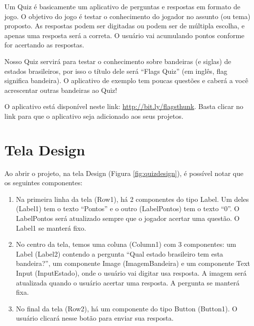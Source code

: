 \documentclass[11pt,fleqn]{book} %
\begin{document}
Um Quiz é basicamente um aplicativo de perguntas e respostas em formato de jogo. O objetivo do jogo é testar o conhecimento do jogador no assunto (ou tema) proposto. As respostas podem ser digitadas ou podem ser de múltipla escolha, e apenas uma resposta será a correta. O usuário vai acumulando pontos conforme for acertando as respostas. 

Nosso Quiz servirá para testar o conhecimento sobre bandeiras (e siglas) de estados brasileiros, por isso o título dele será ``Flags Quiz'' (em inglês, flag significa bandeira). O aplicativo de exemplo tem poucas questões e caberá a você acrescentar outras bandeiras ao Quiz!


O aplicativo está disponível neste link: \url{http://bit.ly/flagsthunk}.
Basta clicar no link para que o aplicativo seja adicionado aos seus projetos.



\section{Tela Design}
Ao abrir o projeto, na tela Design (Figura \ref{fig:quizdesign}), é possível notar que os seguintes componentes:

\begin{enumerate}
\item Na primeira linha da tela (Row1), há 2 componentes do tipo Label. Um deles (Label1) tem o texto ``Pontos'' e o outro (LabelPontos) tem o texto ``0''. O LabelPontos será atualizado sempre que o jogador acertar uma questão. O Label1 se manterá fixo.
\item No centro da tela, temos uma coluna (Column1) com 3 componentes: um Label (Label2) contendo a pergunta ``Qual estado brasileiro tem esta bandeira?'', um componente Image (ImagemBandeira) e um componente Text Input (InputEstado), onde o usuário vai digitar usa resposta. A imagem será atualizada quando o usuário acertar uma resposta. A pergunta se manterá fixa.
\item No final da tela (Row2), há um componente do tipo Button (Button1). O usuário clicará nesse botão para enviar sua resposta. 

\end{enumerate}
\end{document}
